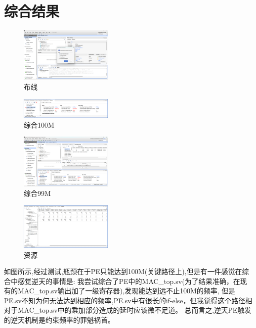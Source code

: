 \documentclass[zihao=-4, UTF8]{ctexart}
\begin{document}
\section{综合结果}
\begin{figure}[H]
      \centering
      \includegraphics[width=0.4\textwidth]{布线.png}
      \caption{布线}
      \label{fig:布线}
    \end{figure}
\begin{figure}[H]
      \centering
      \includegraphics[width=0.4\textwidth]{综合100M.png}
      \caption{综合100M}
      \label{fig:综合100M}
    \end{figure}
\begin{figure}[H]
      \centering
      \includegraphics[width=0.4\textwidth]{综合99M.png}
      \caption{综合99M}
      \label{fig:综合99M}
    \end{figure}
\begin{figure}[H]
  \centering
  \includegraphics[width=0.4\textwidth]{资源.png}
  \caption{资源}
  \label{fig:资源}
\end{figure}
如图所示,经过测试,瓶颈在于PE只能达到100M(关键路径上),但是有一件感觉在综合中感觉逆天的事情是:
我尝试综合了PE中的MAC\_top.sv(为了结果准确，在现有的MAC\_top.sv输出加了一级寄存器),发现能达到远不止100M的频率,
但是PE.sv不知为何无法达到相应的频率,PE.sv中有很长的if-else，但我觉得这个路径相对于MAC\_top.sv中的乘加部分造成的延时应该微不足道。
总而言之,逆天PE触发的逆天机制是约束频率的罪魁祸首。
\end{document}
